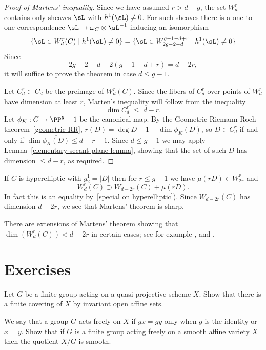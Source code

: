 \begin{proof}[Proof of Martens' inequality] Since we have assumed $r>d-g$, the set $W^r_d$ contains only  sheaves
 $\sL$ with $h^1(\sL)\neq 0$. For such sheaves there is a one-to-one 
correspondence $\sL \to \omega_C\otimes \sL^{-1}$ inducing an isomorphism
$$
\{\sL \in W^r_d(C) \mid h^1(\sL) \neq 0 \}= \{\sL \in W^{g-1-d+r}_{2g-2-d} \mid h^1(\sL) \neq 0 \}%
$$
Since
$$
2g-2-d - 2(g-1-d+r) = d-2r,
$$
it will suffice to prove the theorem in case $d \leq g-1$.

Let $C^r_d\subset C_d$ be the preimage of $W^r_d(C)$. Since the fibers of $C^r_d$ over points of
$W^r_d$ have dimension at least $r$, Marten's inequality will follow from the inequality
$$
\dim C^r_d \; \leq \; d-r.
$$
Let $\phi_K: C\to \PP^g-1$ be the canonical map. By the Geometric Riemann-Roch theorem~\ref{geometric RR}, $r(D) = \deg D -1 -\dim\overline{\phi_K(D)}$, 
so $D\in C^r_d$ if and only if
$\dim \overline{\phi_K(D)}\leq d-r-1$. Since $d\leq g-1$ we may apply  Lemma~\ref{elementary secant plane lemma}, showing that the set of such $D$ has dimension $\leq d-r$, as required.
\end{proof}


If $C$ is hyperelliptic with $g^1_2 = |D|$ then for $r\leq g-1$ we have $\mu(rD) \in W^r_{2r}$ and
$$
W^r_d(C) \supset W_{d-2r}(C) + \mu(rD).
$$
In fact this is an equality by~\ref{special on hyperelliptic}). Since $W_{d-2r}(C)$ has dimension $d-2r$, we see that Martens' theorem is sharp. 

There are extensions of Martens' theorem showing that $\dim(W^r_d(C)) < d-2r$ in certain cases; see for example \cite{Mumford-Prym1} \cite{Keem},
and \cite{Coppens}.

\section{Exercises}

\begin{exercise}
 Let $G$ be a finite group acting on a quasi-projective scheme $X$. Show that there is a finite covering of $X$ by invariant open affine sets. \end{exercise}


\begin{exercise}\label{free actions}
We say that a group $G$ acts freely on $X$ if $gx = gy$ only when $g$ is the identity or $x=y$. Show that
 if $G$ is a finite group acting freely on a smooth affine variety $X$ then the quotient $X/G$ is smooth.
\end{exercise}


